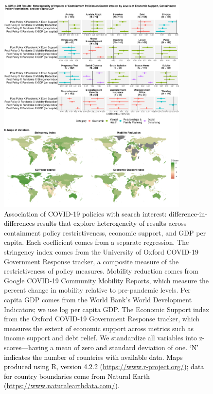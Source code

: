 \documentclass{article}
\begin{document}
\begin{figure}[!t]
    \centering
    \includegraphics[width=0.85\textwidth]{figures/did_interact_map_90.png}
    \caption{\textcolor{black}{Association of COVID-19 policies with search interest: difference-in-differences results that explore heterogeneity of results} across containment policy restrictiveness, economic support, and GDP per capita. Each coefficient comes from a separate regression. The stringency index comes from the University of Oxford COVID-19 Government Response tracker, a composite measure of the restrictiveness of policy measures. Mobility reduction comes from Google COVID-19 Community Mobility Reports, which measure the percent change in mobility relative to pre-pandemic levels. Per capita GDP comes from the World Bank's World Development Indicators; we use log per capita GDP. The Economic Support index from the Oxford COVID-19 Government Response tracker, which measures the extent of economic support across metrics such as income support and debt relief. We standardize all variables into z-scores---having a mean of zero and standard deviation of one. \textcolor{black}{`N' indicates the number of countries with available data. Maps produced using R, version 4.2.2 (\url{https://www.r-project.org/}); data for country boundaries come from Natural Earth (\url{https://www.naturalearthdata.com/}).}}    
    \label{fig:did_interact_map_90}
\end{figure}
\end{document}

